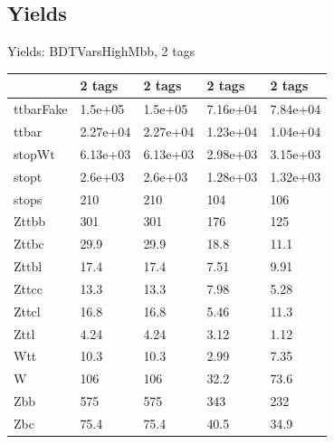
\subsection{Yields}

\begin{frame}{Yields: BDTVarsHighMbb, 2 tags}
\begin{center}
  \begin{tabular}{l| >{\centering\let\newline\\\arraybackslash\hspace{0pt}}m{1.4cm}| >{\centering\let\newline\\\arraybackslash\hspace{0pt}}m{1.4cm}| >{\centering\let\newline\\\arraybackslash\hspace{0pt}}m{1.4cm}| >{\centering\let\newline\\\arraybackslash\hspace{0pt}}m{1.4cm}}
    & 2 tags & 2 tags & 2 tags & 2 tags \\
 \hline \hline
    ttbarFake& 1.5e+05 & 1.5e+05 & 7.16e+04 & 7.84e+04 \\
 \hline
    ttbar& 2.27e+04 & 2.27e+04 & 1.23e+04 & 1.04e+04 \\
 \hline
    stopWt& 6.13e+03 & 6.13e+03 & 2.98e+03 & 3.15e+03 \\
 \hline
    stopt& 2.6e+03 & 2.6e+03 & 1.28e+03 & 1.32e+03 \\
 \hline
    stops& 210 & 210 & 104 & 106 \\
 \hline
    Zttbb& 301 & 301 & 176 & 125 \\
 \hline
    Zttbc& 29.9 & 29.9 & 18.8 & 11.1 \\
 \hline
    Zttbl& 17.4 & 17.4 & 7.51 & 9.91 \\
 \hline
    Zttcc& 13.3 & 13.3 & 7.98 & 5.28 \\
 \hline
    Zttcl& 16.8 & 16.8 & 5.46 & 11.3 \\
 \hline
    Zttl& 4.24 & 4.24 & 3.12 & 1.12 \\
 \hline
    Wtt& 10.3 & 10.3 & 2.99 & 7.35 \\
 \hline
    W& 106 & 106 & 32.2 & 73.6 \\
 \hline
    Zbb& 575 & 575 & 343 & 232 \\
 \hline
    Zbc& 75.4 & 75.4 & 40.5 & 34.9 \\

\end{tabular}
\end{center}
\end{frame}
